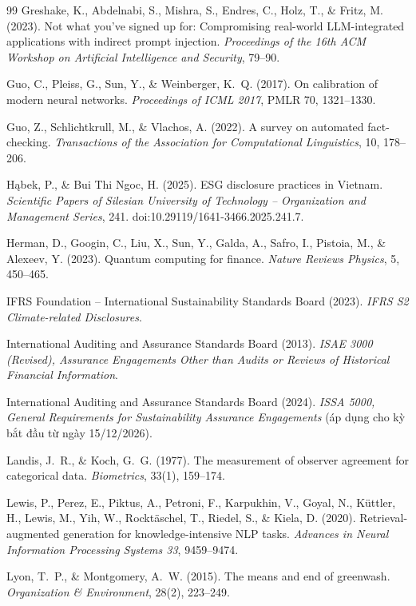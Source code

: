 \begin{thebibliography}{99}
 Greshake, K., Abdelnabi, S., Mishra, S., Endres, C., Holz, T., \& Fritz, M. (2023). Not what you've signed up for: Compromising real-world LLM-integrated applications with indirect prompt injection. \emph{Proceedings of the 16th ACM Workshop on Artificial Intelligence and Security}, 79–90.

 Guo, C., Pleiss, G., Sun, Y., \& Weinberger, K.~Q. (2017). On calibration of modern neural networks. \emph{Proceedings of ICML 2017}, PMLR 70, 1321–1330.

 Guo, Z., Schlichtkrull, M., \& Vlachos, A. (2022). A survey on automated fact-checking. \emph{Transactions of the Association for Computational Linguistics}, 10, 178–206.

 Hąbek, P., \& Bui Thi Ngoc, H. (2025). ESG disclosure practices in Vietnam. \emph{Scientific Papers of Silesian University of Technology – Organization and Management Series}, 241. doi:10.29119/1641-3466.2025.241.7.

 Herman, D., Googin, C., Liu, X., Sun, Y., Galda, A., Safro, I., Pistoia, M., \& Alexeev, Y. (2023). Quantum computing for finance. \emph{Nature Reviews Physics}, 5, 450–465.

 IFRS Foundation – International Sustainability Standards Board (2023). \emph{IFRS S2 Climate-related Disclosures}.

 International Auditing and Assurance Standards Board (2013). \emph{ISAE 3000 (Revised), Assurance Engagements Other than Audits or Reviews of Historical Financial Information}.

 International Auditing and Assurance Standards Board (2024). \emph{ISSA 5000, General Requirements for Sustainability Assurance Engagements} (áp dụng cho kỳ bắt đầu từ ngày 15/12/2026).

 Landis, J.~R., \& Koch, G.~G. (1977). The measurement of observer agreement for categorical data. \emph{Biometrics}, 33(1), 159–174.

 Lewis, P., Perez, E., Piktus, A., Petroni, F., Karpukhin, V., Goyal, N., Küttler, H., Lewis, M., Yih, W., Rocktäschel, T., Riedel, S., \& Kiela, D. (2020). Retrieval-augmented generation for knowledge-intensive NLP tasks. \emph{Advances in Neural Information Processing Systems 33}, 9459–9474.

 Lyon, T.~P., \& Montgomery, A.~W. (2015). The means and end of greenwash. \emph{Organization \& Environment}, 28(2), 223–249.


\end{thebibliography}
